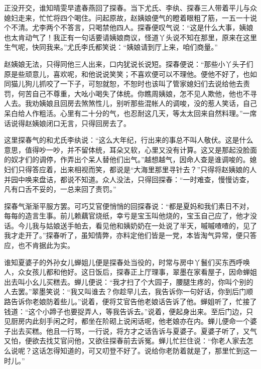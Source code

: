 正没开交，谁知晴雯早遣春燕回了探春。当下尤氏、李纨、探春三人带着平儿与众媳妇走来，忙忙将四个喝住。问起原故，赵姨娘便气的瞪着眼粗了筋，一五一十说个不清。尤李两个不答言，只喝禁他四人。探春便叹气说：“这是什么大事，姨娘也太肯动气了！我正有一句话要请姨娘商议，怪道丫头说不知在那里，原来在这里生气呢，快同我来。”尤氏李氏都笑说：“姨娘请到厅上来，咱们商量。”

赵姨娘无法，只得同他三人出来，口内犹说长说短。探春便说：“那些小丫头子们原是些顽意儿，喜欢呢，和他说说笑笑；不喜欢便可以不理他。便他不好了，也如同猫儿狗儿抓咬了一下子，可恕就恕，不恕时也该叫了管家媳妇们去说给他去责罚，何苦自己不尊重，大吆小喝失了体统。你瞧周姨娘，怎不见人欺他，他也不寻人去。我劝姨娘且回房去煞煞性儿，别听那些混帐人的调唆，没的惹人笑话，自己呆白给人作粗活。心里有二十分的气，也忍耐这几天，等太太回来自然料理。”一席话说得赵姨娘闭口无言，只得回房去了。

这里探春气的和尤氏李纨说：“这么大年纪，行出来的事总不叫人敬伏。这是什么意思，值得吵一吵，并不留体统，耳朵又软，心里又没有计算。这又是那起没脸面的奴才们的调停，作弄出个呆人替他们出气。”越想越气，因命人查是谁调唆的。媳妇们只得答应着，出来相视而笑，都说是“大海里那里寻针去？”只得将赵姨娘的人并园中唤来盘诘，都说不知道。众人没法，只得回探春：“一时难查，慢慢访查，凡有口舌不妥的，一总来回了责罚。”

探春气渐渐平服方罢。可巧艾官便悄悄的回探春说：“都是夏妈和我们素日不对，每每的造言生事。前儿赖藕官烧纸，幸亏是宝玉叫他烧的，宝玉自己应了，他才没话。今儿我与姑娘送手帕去，看见他和姨奶奶在一处说了半天，嘁嘁喳喳的，见了我才走开了。”探春听了，虽知情弊，亦料定他们皆是一党，本皆淘气异常，便只答应，也不肯据此为实。

谁知夏婆子的外孙女儿蝉姐儿便是探春处当役的，时常与房中丫鬟们买东西呼唤人，众女孩儿都和他好。这日饭后，探春正上厅理事，翠墨在家看屋子，因命蝉姐出去叫小幺儿买糕去。蝉儿便说：“我才扫了个大园子，腰腿生疼的，你叫个别的人去罢。”翠墨笑说：“我又叫谁去？你趁早儿去，我告诉你一句好话，你到后门顺路告诉你老娘防着些儿。”说着，便将艾官告他老娘话告诉了他。蝉姐听了，忙接了钱道：“这个小蹄子也要捉弄人，等我告诉去。”说着，便起身出来。至后门边，只见厨房内此刻手闲之时，都坐在阶砌上说闲话呢，他老娘亦在内。蝉儿便命一个婆子出去买糕。他且一行骂，一行说，将方才之话告诉与夏婆子。夏婆子听了，又气又怕，便欲去找艾官问他，又欲往探春前去诉冤。蝉儿忙拦住说：“你老人家去怎么说呢？这话怎得知道的，可又叨登不好了。说给你老防着就是了，那里忙到这一时儿。”

